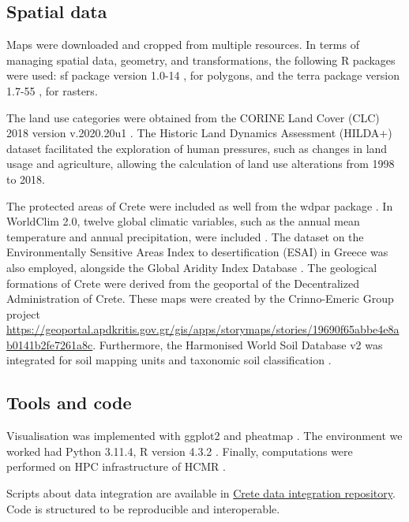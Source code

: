 \subsection{Spatial data}\label{crete_spatial}

Maps were downloaded and cropped from multiple resources.
In terms of managing spatial data, geometry, and transformations, the following
R packages were used:
sf package version 1.0-14 \parencite{Pebesma2023}, for polygons, and the terra
package version 1.7-55 \parencite{hijmans2024terra}, for rasters.

The land use categories were obtained from the CORINE Land Cover (CLC) 2018
version v.2020.20u1 \parencite{CLC2023}.
The Historic Land Dynamics Assessment (HILDA+) dataset \parencite{winkler2021global}
facilitated the exploration of human pressures, such as changes in land usage and agriculture,
allowing the calculation of land use alterations from 1998 to 2018.

The protected areas of Crete were included as well from the wdpar package \parencite{Hanson2022}.
In WorldClim 2.0, twelve global climatic variables, such as the annual mean
temperature and annual precipitation, were included \parencite{Fick2017}.
The dataset on the Environmentally Sensitive Areas Index to desertification (ESAI)
in Greece \parencite{KARAMESOUTI2018266} was also employed, alongside the
Global Aridity Index Database \parencite{zomer2022version}.
The geological formations of Crete were derived from the geoportal of the
Decentralized Administration of Crete. These maps were created by the Crinno-Emeric Group
project \url{https://geoportal.apdkritis.gov.gr/gis/apps/storymaps/stories/19690f65abbe4e8ab0141b2fe7261a8c}.
Furthermore, the Harmonised World Soil Database v2 was integrated for soil mapping units and taxonomic soil classification \parencite{fao2023}.

\subsection{Tools and code}\label{Coding environment}
Visualisation was implemented with ggplot2 \parencite{wickham_ggplot2_2016} and pheatmap \parencite{Kolde2019}.
The environment we worked had Python 3.11.4, R version 4.3.2 \parencite{rcoreteam}.
Finally, computations were performed on HPC infrastructure of HCMR \parencite{zafeiropoulos_0s_2021}.

Scripts about data integration are available in
\href{https://github.com/savvas-paragkamian/crete-data-integration}{Crete data integration repository}.
Code is structured to be reproducible and interoperable.

